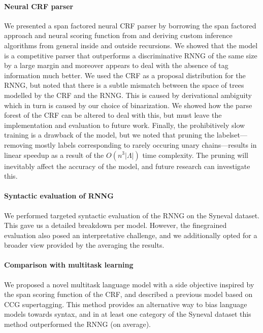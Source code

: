   \paragraph{Neural CRF parser}
    We presented a span factored neural CRF parser by borrowing the span factored approach and neural scoring function from \cite{stern2017minimal} and deriving custom inference algorithms from general inside and outside recursions. We showed that the model is a competitive parser that outperforms a discriminative RNNG of the same size by a large margin and moreover appears to deal with the absence of tag information much better. We used the CRF as a proposal distribution for the RNNG, but noted that there is a subtle mismatch between the space of trees modelled by the CRF and the RNNG. This is caused by derivational ambiguity which in turn is caused by our choice of binarization. We showed how the parse forest of the CRF can be altered to deal with this, but must leave the implementation and evaluation to future work. Finally, the prohibitively slow training is a drawback of the model, but we noted that pruning the labelset---removing mostly labels corresponding to rarely occuring unary chains---results in linear speedup as a result of the $O(n^3 \lvert \Lambda \rvert)$ time complexity. The pruning will inevitably affect the accuracy of the model, and future research can investigate this.

  \paragraph{Syntactic evaluation of RNNG}
    We performed targeted syntactic evaluation of the RNNG on the Syneval dataset. This gave us a detailed breakdown per model. However, the finegrained evaluation also posed an interpretative challenge, and we additionally opted for a broader view provided by the averaging the results.

  \paragraph{Comparison with multitask learning}
    We proposed a novel multitask language model with a side objective inspired by the span scoring function of the CRF, and described a previous model based on CCG supertagging. This method provides an alternative way to bias language models towards syntax, and in at least one category of the Syneval dataset this method outperformed the RNNG (on average).

